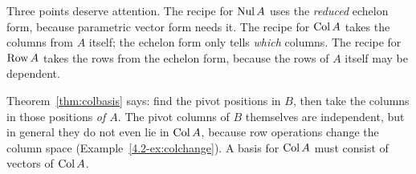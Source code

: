 \documentclass[11pt]{article}
\begin{document}
Three points deserve attention. The recipe for $\operatorname{Nul} A$ uses the \emph{reduced} echelon form, because parametric vector form needs it. The recipe for $\operatorname{Col} A$ takes the columns from $A$ itself; the echelon form only tells \emph{which} columns. The recipe for $\operatorname{Row} A$ takes the rows from the echelon form, because the rows of $A$ itself may be dependent.

\begin{warn}
Theorem~\ref{thm:colbasis} says: find the pivot positions in $B$, then take the columns in those positions \emph{of $A$}. The pivot columns of $B$ themselves are independent, but in general they do not even lie in $\operatorname{Col} A$, because row operations change the column space (Example~\ref{4.2-ex:colchange}). A basis for $\operatorname{Col} A$ must consist of vectors of $\operatorname{Col} A$.
\end{warn}
\end{document}
